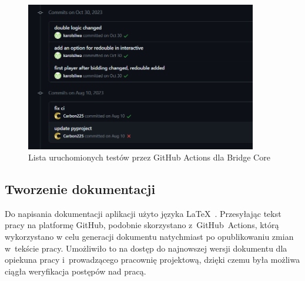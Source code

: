 \begin{figure}[hbt!]
    \centering
    \includegraphics[width=0.9\textwidth]{img/github/github-commits.png}
    \caption{Lista uruchomionych testów przez GitHub Actions dla Bridge Core}
    \label{fig:github-tests}
\end{figure}


\subsection{Tworzenie dokumentacji}

Do napisania dokumentacji aplikacji użyto języka \LaTeX~\cite{Latex}.
Przesyłając tekst pracy na platformę GitHub, podobnie skorzystano
\mbox{z GitHub Actions}, którą wykorzystano w celu
generacji dokumentu natychmiast po opublikowaniu zmian w~tekście pracy.
Umożliwiło to na dostęp do najnowszej wersji dokumentu dla opiekuna
pracy i~prowadzącego pracownię projektową, dzięki czemu była możliwa
ciągła weryfikacja postępów nad pracą.

